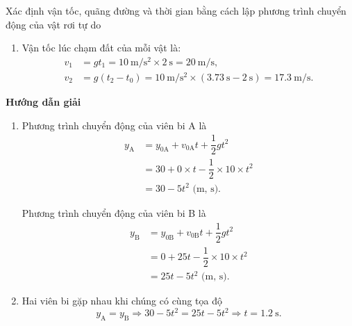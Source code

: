 \begin{dang}{Xác định vận tốc, quãng đường và thời gian bằng cách lập phương trình chuyển động của vật rơi tự do}
{\begin{enumerate}[label=\alph*.]
			Vậy hai vật không chạm đất cùng lúc.
			\item Vận tốc lúc chạm đất của mỗi vật là:
				\begin{align*}
					v_1&=gt_1=\SI{10}{\meter/\second^{2}}\times\SI{2}{\second}=\SI{20}{\meter/\second},\\
					v_2&=g(t_2-t_0)=\SI{10}{\meter/\second^{2}}\times(\SI{3.73}{\second}-\SI{2}{\second})=\SI{17.3}{\meter/\second}.
				\end{align*}
		\end{enumerate}
	}

	{	\begin{center}
			\textbf{Hướng dẫn giải}
		\end{center}
		
		\begin{enumerate}[label=\alph*.]
			\item 
			Phương trình chuyển động của viên bi A là
			\begin{align*}
				y_{\text{A}}&=y_{0\text{A}}+v_{0\text{A}}t+\dfrac{1}{2}gt^2\\
				&=30+0\times t-\dfrac{1}{2}\times 10\times t^{2}\\
				&=30-5t^2 \textrm{ (m, s)}.
			\end{align*}
			
			Phương trình chuyển động của viên bi B là
			\begin{align*}
				y_{\text{B}}&=y_{0\text{B}}+v_{0\text{B}}t+\dfrac{1}{2}gt^2\\
				&=0+25t-\dfrac{1}{2}\times10\times t^{2}\\
				&=25t-5t^2\textrm{ (m, s)}.
			\end{align*}
			\item 
			Hai viên bi gặp nhau khi chúng có cùng tọa độ
			\begin{equation*}
				y_{\text{A}}=y_{\text{B}}\Rightarrow 30-5t^2=25t-5t^2 \Rightarrow t=\SI{1.2}{\second}.
			\end{equation*}
			

\end{enumerate}}
\end{dang}

